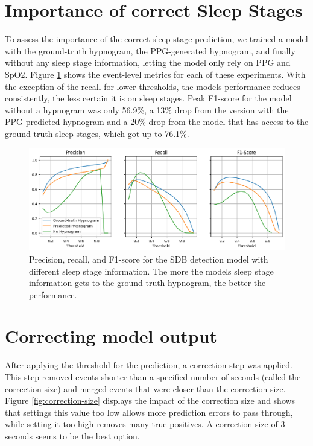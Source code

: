 \section{Importance of correct Sleep Stages}

To assess the importance of the correct sleep stage prediction, we trained a model with the ground-truth hypnogram, the PPG-generated hypnogram, and finally without any sleep stage information, letting the model only rely on PPG and SpO2. Figure \ref{fig:sleep-stage-importance} shows the event-level metrics for each of these experiments. With the exception of the recall for lower thresholds, the models performance reduces consistently, the less certain it is on sleep stages. Peak F1-score for the model without a hypnogram was only 56.9\%, a 13\% drop from the version with the PPG-predicted hypnogram and a 20\% drop from the model that has access to the ground-truth sleep stages, which got up to 76.1\%.

\begin{figure}
    \centering
    \includegraphics[width=\textwidth]{images/SleepStages}
    \caption{Precision, recall, and F1-score for the SDB detection model with different sleep stage information. The more the models sleep stage information gets to the ground-truth hypnogram, the better the performance.}
    \label{fig:sleep-stage-importance}
\end{figure}

\section{Correcting model output}

After applying the threshold for the prediction, a correction step was applied. This step removed events shorter than a specified number of seconds (called the correction size) and merged events that were closer than the correction size. Figure \ref{fig:correction-size} displays the impact of the correction size and shows that settings this value too low allows more prediction errors to pass through, while setting it too high removes many true positives. A correction size of 3 seconds seems to be the best option.

